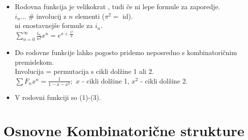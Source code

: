 \documentclass[a4paper, 12pt]{book}
\theoremstyle{definition}
\theoremstyle{remark}
\begin{document}
\begin{itemize}[label={--}]
  \item Rodovna funkcija je velikokrat , tudi če ni lepe formule za zaporedje. \\
    $i_n \dots$ \# involucij z $n$ elementi ($\pi^2 = $ id). \\
    ni enostavnejše formule za $i_n$. \\
    $\sum_{n=0}^{\infty} \frac{i_n}{n!} x^n = e^{x + \frac{x^2}{2}}$
  \item Do rodovne funkcije lahko pogosto pridemo neposredno s kombinatoričnim premislekom. \\
    Involucija = permutacija s cikli dolžine 1 ali 2. \\
    $\sum F_n x^n = \frac{1}{1-x-x^2};$ $x$ - cikli dolžine 1, $x^2$ - cikli dolžine 2.
  \item V rodovni funkciji so  (1)-(3).
\end{itemize}


\section{Osnovne Kombinatorične strukture}
\end{document}
